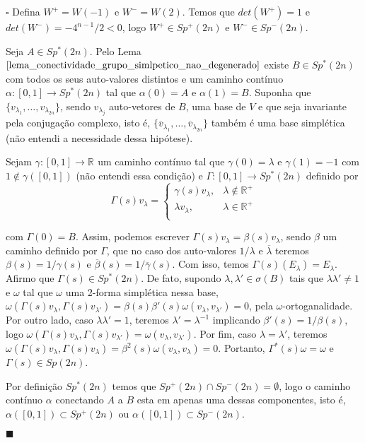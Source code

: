 \documentclass[12pt]{book}
\newenvironment{prova}[1]{$\square$ #1}{\hfill$\blacksquare$}
\newcommand{\funcaocond}[5]{
	#1 = 
	\left\{
	\begin{array}{cc}
		#2, & #3\\
		#4, & #5\\
	\end{array}
	\right.
}
\newcommand{\gruposimpletico}[1]{Sp(#1)}
\newcommand{\gruposimpleticonaodegenerado}[1]{Sp^{#1}(2n)}
\newcommand{\real}[1]{\mathbb{R}^{#1}}
\newcommand{\reta}{\real{}}
\newcommand{\vermelho}[1]{{\color{red}#1}}
\begin{document}
\begin{prova}
		Defina $W^{+} = W(-1)$ e $W^{-} = W(2)$. Temos que $det(W^{+}) = 1$  e $det(W^{-}) = -4^{n-1}/2 <0$, logo $W^{+}\in \gruposimpleticonaodegenerado{+}$ e $W^{-}\in \gruposimpleticonaodegenerado{-}$. 
		
		Seja $A \in \gruposimpleticonaodegenerado{*}$. Pelo Lema $\ref{lema_conectividade_grupo_simlpetico_nao_degenerado}$ existe $B \in \gruposimpleticonaodegenerado{*}$ com todos os seus auto-valores distintos  e um caminho contínuo $\alpha:[0,1] \to \gruposimpleticonaodegenerado{*}$ tal que $\alpha(0)=A$ e $\alpha(1) = B$. Suponha que $\{v_{\lambda_{1}}, \dots , v_{\lambda_{2n}} \}$, sendo $v_{\lambda_{j}}$ auto-vetores de $B$, uma base de $V$ e que seja invariante pela conjugação complexo, isto é, $\{\overline{v}_{\lambda_{1}}, \dots , \overline{v}_{\lambda_{2n}} \}$ também é uma base simplética \vermelho{(não entendi a necessidade dessa hipótese)}. 
		
		Sejam $\gamma:[0,1]\to \reta$ um caminho contínuo tal que $\gamma(0) = \lambda$ e $\gamma(1) = -1$ com $1 \notin \gamma([0,1])$ \vermelho{(não entendi essa condição)} e $\Gamma:[0,1 ]\to \gruposimpleticonaodegenerado{*}$ definido por
		$$
		\funcaocond{\Gamma(s)v_{\lambda}}{\gamma(s)v_{\lambda}}{\lambda \notin \real{+}}{\lambda v_{\lambda} }{\lambda \in \real{+}}
		$$
		
		com $\Gamma(0) = B$. Assim, podemos escrever $\Gamma(s)v_{\lambda} = \beta(s)v_{\lambda}$, sendo $\beta$ um caminho definido por $\Gamma$, que no caso dos auto-valores $1/\lambda$ e $\overline{\lambda}$ teremos $\beta(s) = 1/\gamma(s)$ e $\overline{\beta}(s) = 1/\overline{\gamma}(s)$. Com isso, temos $\Gamma(s)(E_{\lambda}) = E_{\lambda}$. Afirmo que $\Gamma(s) \in \gruposimpleticonaodegenerado{*}$. De fato, supondo $\lambda,\lambda' \in \sigma(B)$ tais que $\lambda\lambda' \neq 1$ e $\omega$ tal que $\omega$ uma 2-forma simplética nessa base,  $\omega(\Gamma(s)v_{\lambda},\Gamma(s)v_{\lambda'}) = \beta(s)\beta'(s)\omega(v_{\lambda},v_{\lambda'}) = 0$, pela $\omega$-ortoganalidade. Por outro lado, caso $\lambda\lambda'=1$, teremos $\lambda'=\lambda^{-1}$ implicando $\beta'(s) = 1/\beta(s)$, logo $\omega(\Gamma(s)v_{\lambda},\Gamma(s)v_{\lambda'}) = \omega(v_{\lambda},v_{\lambda'})$. Por fim, caso $\lambda = \lambda'$, teremos $\omega(\Gamma(s)v_{\lambda},\Gamma(s)v_{\lambda}) = \beta^{2}(s)\omega(v_{\lambda},v_{\lambda}) =0$. Portanto, $\Gamma^{*}(s)\omega = \omega$ e $\Gamma(s) \in \gruposimpletico{2n}$.
		
		Por definição $\gruposimpleticonaodegenerado{*}$ temos que $\gruposimpleticonaodegenerado{+} \cap \gruposimpleticonaodegenerado{-}=\emptyset$, logo o caminho contínuo $\alpha$ conectando $A$ a $B$ esta em apenas uma dessas componentes, isto é, $\alpha([0,1]) \subset \gruposimpleticonaodegenerado{+}$ ou $\alpha([0,1]) \subset \gruposimpleticonaodegenerado{-}$.
		

\end{prova}
\end{document}
